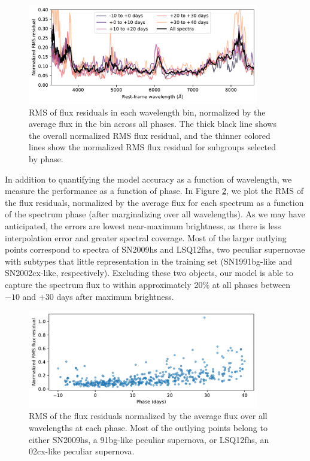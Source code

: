 \begin{figure}
    \centering
\includegraphics[width=0.9\textwidth]{figures/nn_twins/embed2spec_rms_wavelength.pdf}
    \caption{RMS of \etos{} flux residuals in each wavelength bin, normalized by the average flux in the bin across all phases. The thick black line shows the overall normalized RMS flux residual, and the thinner colored lines show the normalized RMS flux residual for subgroups selected by phase.}
    \label{fig:e2s_wavelength_resids}
\end{figure}

In addition to quantifying the model accuracy as a function of wavelength, we measure the performance as a function of phase. In Figure \ref{fig:e2s_phase_resids}, we plot the RMS of the flux residuals, normalized by the average flux for each spectrum as a function of the spectrum phase (after marginalizing over all wavelengths). As we may have anticipated, the errors are lowest near-maximum brightness, as there is less interpolation error and greater spectral coverage. Most of the larger outlying points correspond to spectra of SN2009hs and LSQ12fhs, two peculiar supernovae with subtypes that little representation in the training set (SN1991bg-like and SN2002cx-like, respectively). Excluding these two objects, our model is able to capture the spectrum flux to within approximately 20\% at all phases between $-10$ and $+30$ days after maximum brightness.

\begin{figure}
    \centering
    \includegraphics[width=0.9\textwidth]{figures/nn_twins/embed2spec_rms_phase.pdf}
    \caption{RMS of the flux residuals normalized by the average flux over all wavelengths at each phase. Most of the outlying points belong to either SN2009hs, a 91bg-like peculiar supernova, or LSQ12fhs, an 02cx-like peculiar supernova.}
    \label{fig:e2s_phase_resids}
\end{figure}

